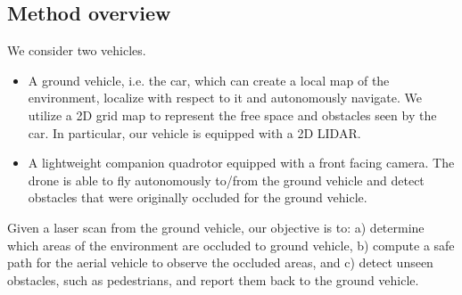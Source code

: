 
\subsection{Method overview}

We consider two vehicles.
\begin{itemize}
\item
A ground vehicle, i.e. the car, which can create a local map of the environment, localize with respect to it and autonomously navigate. We utilize a 2D grid map to represent the free space and obstacles seen by the car. In particular, our vehicle is equipped with a 2D LIDAR. 
\item
A lightweight companion quadrotor equipped with a front facing camera. The drone is able to fly autonomously to/from the ground vehicle and detect obstacles that were originally occluded for the ground vehicle.
\end{itemize}

Given a laser scan from the ground vehicle, our objective is to:
a) determine which areas of the environment are occluded to ground vehicle,
b) compute a safe path for the aerial vehicle to observe the occluded areas, and
c) detect unseen obstacles, such as pedestrians, and report them back to the ground vehicle.


%
%
%


